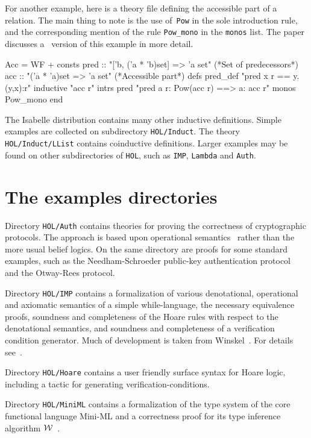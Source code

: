 For another example, here is a theory file defining the accessible
part of a relation.  The main thing to note is the use of~{\tt Pow} in
the sole introduction rule, and the corresponding mention of the rule
\verb|Pow_mono| in the \texttt{monos} list.  The paper
\cite{paulson-CADE} discusses a \ZF\ version of this example in more
detail.
\begin{ttbox}
Acc = WF + 
consts pred :: "['b, ('a * 'b)set] => 'a set"   (*Set of predecessors*)
       acc  :: "('a * 'a)set => 'a set"         (*Accessible part*)
defs   pred_def  "pred x r == {y. (y,x):r}"
inductive "acc r"
  intrs
     pred "pred a r: Pow(acc r) ==> a: acc r"
  monos   Pow_mono
end
\end{ttbox}
The Isabelle distribution contains many other inductive definitions.  Simple
examples are collected on subdirectory \texttt{HOL/Induct}.  The theory
\texttt{HOL/Induct/LList} contains coinductive definitions.  Larger examples
may be found on other subdirectories of \texttt{HOL}, such as {\tt IMP},
\texttt{Lambda} and \texttt{Auth}.

 


\section{The examples directories}

Directory \texttt{HOL/Auth} contains theories for proving the correctness of 
cryptographic protocols.  The approach is based upon operational 
semantics~\cite{paulson-security} rather than the more usual belief logics.
On the same directory are proofs for some standard examples, such as the 
Needham-Schroeder public-key authentication protocol~\cite{paulson-ns} 
and the Otway-Rees protocol.

Directory \texttt{HOL/IMP} contains a formalization of various denotational,
operational and axiomatic semantics of a simple while-language, the necessary
equivalence proofs, soundness and completeness of the Hoare rules with respect
to the 
denotational semantics, and soundness and completeness of a verification
condition generator.  Much of development is taken from
Winskel~\cite{winskel93}.  For details see~\cite{nipkow-IMP}.

Directory \texttt{HOL/Hoare} contains a user friendly surface syntax for Hoare
logic, including a tactic for generating verification-conditions.

Directory \texttt{HOL/MiniML} contains a formalization of the type system of the
core functional language Mini-ML and a correctness proof for its type
inference algorithm $\cal W$~\cite{milner78,nazareth-nipkow}.

